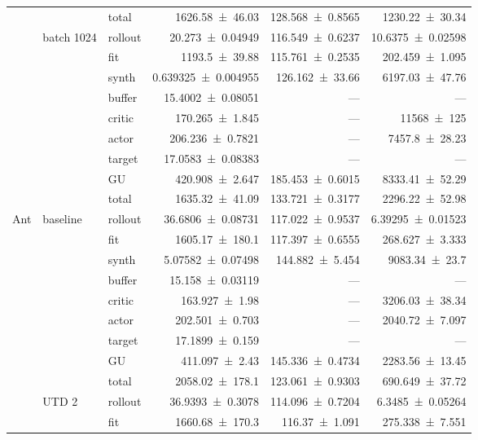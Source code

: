 {\begin{longtable}{@{}lllrrr@{}}
     &  & total & \num{1626.58+-46.03} & \num{128.568+-0.8565} & \num{1230.22+-30.34} \\
    \addlinespace[2pt]
     & batch 1024 & rollout & \num{20.273+-0.04949} & \num{116.549+-0.6237} & \num{10.6375+-0.02598} \\
     &  & fit & \num{1193.5+-39.88} & \num{115.761+-0.2535} & \num{202.459+-1.095} \\
     &  & synth & \num{0.639325+-0.004955} & \num{126.162+-33.66} & \num{6197.03+-47.76} \\
     &  & buffer & \num{15.4002+-0.08051} & --- & --- \\
     &  & critic & \num{170.265+-1.845} & --- & \num{11568+-125} \\
     &  & actor & \num{206.236+-0.7821} & --- & \num{7457.8+-28.23} \\
     &  & target & \num{17.0583+-0.08383} & --- & --- \\
     &  & GU & \num{420.908+-2.647} & \num{185.453+-0.6015} & \num{8333.41+-52.29} \\
     &  & total & \num{1635.32+-41.09} & \num{133.721+-0.3177} & \num{2296.22+-52.98} \\
    \addlinespace[2pt]
    \midrule
    Ant & baseline & rollout & \num{36.6806+-0.08731} & \num{117.022+-0.9537} & \num{6.39295+-0.01523} \\
     &  & fit & \num{1605.17+-180.1} & \num{117.397+-0.6555} & \num{268.627+-3.333} \\
     &  & synth & \num{5.07582+-0.07498} & \num{144.882+-5.454} & \num{9083.34+-23.7} \\
     &  & buffer & \num{15.158+-0.03119} & --- & --- \\
     &  & critic & \num{163.927+-1.98} & --- & \num{3206.03+-38.34} \\
     &  & actor & \num{202.501+-0.703} & --- & \num{2040.72+-7.097} \\
     &  & target & \num{17.1899+-0.159} & --- & --- \\
     &  & GU & \num{411.097+-2.43} & \num{145.336+-0.4734} & \num{2283.56+-13.45} \\
     &  & total & \num{2058.02+-178.1} & \num{123.061+-0.9303} & \num{690.649+-37.72} \\
    \addlinespace[2pt]
     & UTD 2 & rollout & \num{36.9393+-0.3078} & \num{114.096+-0.7204} & \num{6.3485+-0.05264} \\
     &  & fit & \num{1660.68+-170.3} & \num{116.37+-1.091} & \num{275.338+-7.551} \\

\end{longtable}}
